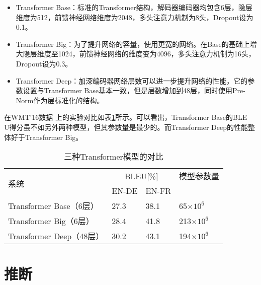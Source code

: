 \begin{itemize}
\vspace{0.5em}
\item  Transformer Base：标准的Transformer结构，解码器编码器均包含6层，隐层维度为512，前馈神经网络维度为2048，多头注意力机制为8头，Dropout设为0.1。
\vspace{0.5em}
\item  Transformer Big：为了提升网络的容量，使用更宽的网络。在Base的基础上增大隐层维度至1024，前馈神经网络的维度变为4096，多头注意力机制为16头，Dropout设为0.3。
\vspace{0.5em}
\item Transformer Deep：加深编码器网络层数可以进一步提升网络的性能，它的参数设置与Transformer Base基本一致，但是层数增加到48层，同时使用Pre-Norm作为层标准化的结构。
\vspace{0.5em}
\end{itemize}

\parinterval 在WMT'16数据 上的实验对比如表\ref{tab:12-3}所示。可以看出，Transformer Base的BLE\\U得分虽不如另外两种模型，但其参数量是最少的。而Transformer Deep的性能整体好于Transformer Big。

\begin{table}[htp]
\centering
\caption{三种Transformer模型的对比}
\label{tab:12-3}
\begin{tabular}{l | l l l}
\multirow{2}{*}{系统}   & \multicolumn{2}{c}{BLEU[\%]} & 模型参数量 \\
                      & EN-DE  & EN-FR  &                                  \\ \hline
Transformer Base（6层）     & 27.3            & 38.1            & 65$\times 10^{6}$                \\
Transformer Big（6层）      & 28.4            & 41.8            & 213$\times 10^{6}$               \\
Transformer Deep（48层） & 30.2            & 43.1            & 194$\times 10^{6}$              \\
\end{tabular}
\end{table}

\sectionnewpage
\section{推断}

